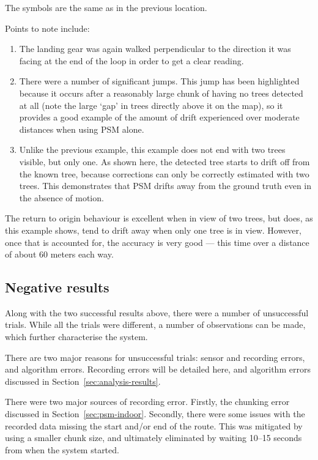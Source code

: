 \documentclass[12pt,oneside,a4paper]{book}
\begin{document}
The symbols are the same as in the previous location.

Points to note include:
\begin{enumerate}[A:]
\item The landing gear was again walked perpendicular to the direction
  it was facing at the end of the loop in order to get a clear
  reading.
\item There were a number of significant jumps. This jump has been
  highlighted because it occurs after a reasonably large chunk of
  having no trees detected at all (note the large `gap' in trees
  directly above it on the map), so it provides a good example of the
  amount of drift experienced over moderate distances when using PSM
  alone.
\item Unlike the previous example, this example does not end with two
  trees visible, but only one. As shown here, the detected tree starts
  to drift off from the known tree, because corrections can only be
  correctly estimated with two trees. This demonstrates that PSM
  drifts away from the ground truth even in the absence of motion.
\end{enumerate}

The return to origin behaviour is excellent when in view of two trees,
but does, as this example shows, tend to drift away when only one tree
is in view. However, once that is accounted for, the accuracy is very
good --- this time over a distance of about 60 meters each way.

\subsection{Negative results}
\label{sec:negative-results}

Along with the two successful results above, there were a number of
unsuccessful trials. While all the trials were different, a number of
observations can be made, which further characterise the system.

There are two major reasons for unsuccessful trials: sensor and
recording errors, and algorithm errors. Recording errors will be
detailed here, and algorithm errors discussed in
Section~\ref{sec:analysis-results}.

There were two major sources of recording error. Firstly, the chunking
error discussed in Section~\ref{sec:psm-indoor}. Secondly, there were some
issues with the recorded data missing the start and/or end of the
route. This was mitigated by using a smaller chunk size, and
ultimately eliminated by waiting 10--15 seconds from when the system
started.
\end{document}
